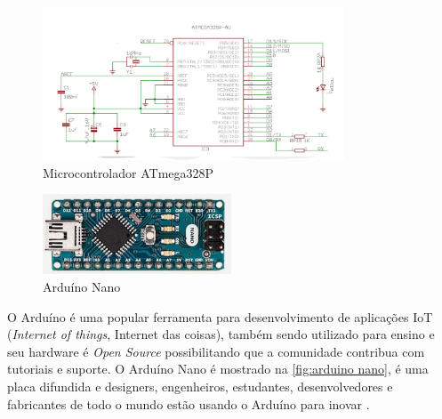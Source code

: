    \begin{figure}[h!]
              \caption{\label{fig:ATmega}{Microcontrolador ATmega328P}}
              \centering
              \includegraphics[width=0.8\textwidth]{Figuras/atmega.PNG}
    \end{figure}
    \begin{figure}[h!]
              \caption{\label{fig:arduino nano}{Arduíno Nano}}
              \centering
              \includegraphics[width=0.5\textwidth]{Figuras/arduino_nano.png}
    \end{figure}
    \par
    O Arduíno é uma popular ferramenta para desenvolvimento de aplicações IoT (\textit{Internet of things}, Internet das coisas), também sendo utilizado para ensino e seu hardware é \textit{Open Source} possibilitando que a comunidade contribua com tutoriais e suporte. O Arduíno Nano é mostrado na \autoref{fig:arduino nano}, é uma placa difundida e designers, engenheiros, estudantes, desenvolvedores e fabricantes de todo o mundo estão usando o Arduíno para inovar \cite{arduino}.
    
%  
